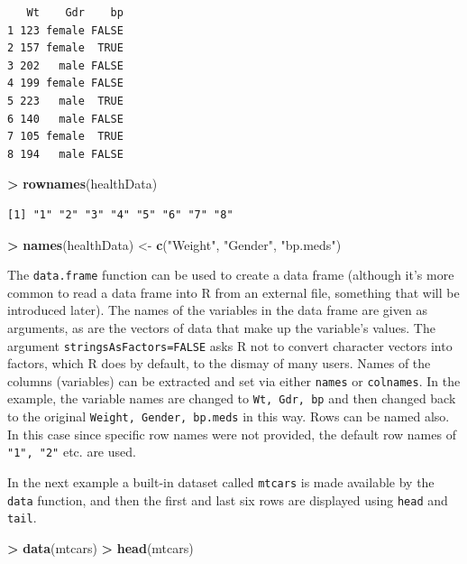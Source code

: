\documentclass[]{krantz}
\makeatletter
\newenvironment{Shaded}{\begin{snugshade}}{\end{snugshade}}
\newcommand{\KeywordTok}[1]{\textcolor[rgb]{0.27,0.27,0.27}{\textbf{#1}}}
\newcommand{\StringTok}[1]{\textcolor[rgb]{0.5,0.5,0.5}{#1}}
\newcommand{\OperatorTok}[1]{\textcolor[rgb]{0.43,0.43,0.43}{\textbf{#1}}}
\newcommand{\NormalTok}[1]{#1}
\newenvironment{kframe}{%
\medskip{}
\setlength{\fboxsep}{.8em}
 \def\at@end@of@kframe{}%
 \ifinner\ifhmode%
  \def\at@end@of@kframe{\end{minipage}}%
  \begin{minipage}{\columnwidth}%
 \fi\fi%
 \def\FrameCommand##1{\hskip\@totalleftmargin \hskip-\fboxsep
 \colorbox{shadecolor}{##1}\hskip-\fboxsep
     \hskip-\linewidth \hskip-\@totalleftmargin \hskip\columnwidth}%
 \MakeFramed {\advance\hsize-\width
   \@totalleftmargin\z@ \linewidth\hsize
   \@setminipage}}%
 {\par\unskip\endMakeFramed%
 \at@end@of@kframe}
\renewenvironment{Shaded}{\begin{kframe}}{\end{kframe}}
\makeatother
\begin{document}
\begin{verbatim}
   Wt    Gdr    bp
1 123 female FALSE
2 157 female  TRUE
3 202   male FALSE
4 199 female FALSE
5 223   male  TRUE
6 140   male FALSE
7 105 female  TRUE
8 194   male FALSE
\end{verbatim}

\begin{Shaded}
\begin{Highlighting}[]
\OperatorTok{>}\StringTok{ }\KeywordTok{rownames}\NormalTok{(healthData)}
\end{Highlighting}
\end{Shaded}

\begin{verbatim}
[1] "1" "2" "3" "4" "5" "6" "7" "8"
\end{verbatim}

\begin{Shaded}
\begin{Highlighting}[]
\OperatorTok{>}\StringTok{ }\KeywordTok{names}\NormalTok{(healthData) <-}\StringTok{ }\KeywordTok{c}\NormalTok{(}\StringTok{"Weight"}\NormalTok{, }\StringTok{"Gender"}\NormalTok{, }\StringTok{"bp.meds"}\NormalTok{)}
\end{Highlighting}
\end{Shaded}

The \texttt{data.frame} function can be used to create a data frame
(although it's more common to read a data frame into R from an external
file, something that will be introduced later). The names of the
variables in the data frame are given as arguments, as are the vectors
of data that make up the variable's values. The argument
\texttt{stringsAsFactors=FALSE} asks R not to convert character vectors
into factors, which R does by default, to the dismay of many users.
Names of the columns (variables) can be extracted and set via either
\texttt{names} or \texttt{colnames}. In the example, the variable names
are changed to \texttt{Wt,\ Gdr,\ bp} and then changed back to the
original \texttt{Weight,\ Gender,\ bp.meds} in this way. Rows can be
named also. In this case since specific row names were not provided, the
default row names of \texttt{"1",\ "2"} etc. are used.

In the next example a built-in dataset called \texttt{mtcars} is made
available by the \texttt{data} function, and then the first and last six
rows are displayed using \texttt{head} and \texttt{tail}.

\begin{Shaded}
\begin{Highlighting}[]
\OperatorTok{>}\StringTok{ }\KeywordTok{data}\NormalTok{(mtcars)}
\OperatorTok{>}\StringTok{ }\KeywordTok{head}\NormalTok{(mtcars)}
\end{Highlighting}
\end{Shaded}
\end{document}
